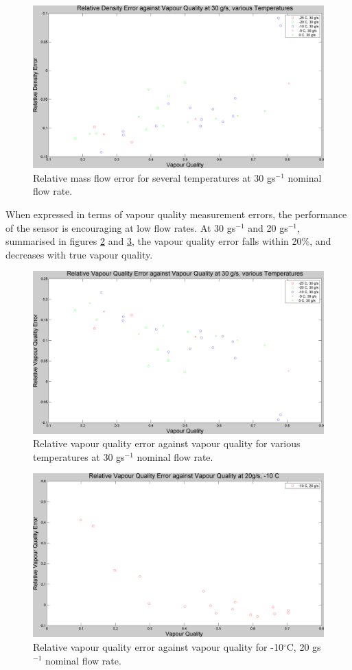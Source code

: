 \documentclass{report}
\begin{document}
\begin{figure}
\includegraphics[width=\textwidth]{plots/fig8}
\caption{Relative mass flow error for several temperatures at 30 gs$^{-1}$ nominal flow rate.}
\label{plot:8}
\end{figure}

When expressed in terms of vapour quality measurement errors, the performance of the sensor is encouraging at low flow rates. At 30 gs$^{-1}$ and 20 gs$^{-1}$, summarised in figures \ref{plot:9} and \ref{plot:10}, the vapour quality error falls within 20\%, and decreases with true vapour quality.
\begin{figure}
\includegraphics[width=\textwidth]{plots/fig9}
\caption{Relative vapour quality error against vapour quality for various temperatures at 30 gs$^{-1}$ nominal flow rate.}
\label{plot:9}
\end{figure}
\begin{figure}
\includegraphics[width=\textwidth]{plots/fig10}
\caption{Relative vapour quality error against vapour quality for -10$^\circ$C, 20 gs$^{-1}$ nominal flow rate.}
\label{plot:10}
\end{figure}
\end{document}

